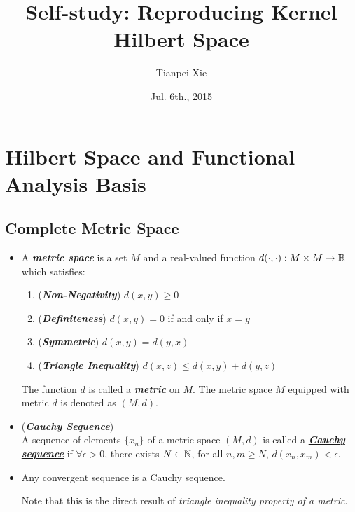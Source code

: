 \documentclass[11pt]{article}
\begin{document}
\title{Self-study: Reproducing Kernel Hilbert Space}
\author{ Tianpei Xie}
\date{ Jul. 6th., 2015 }
\maketitle
\tableofcontents
\newpage
\section{Hilbert Space and Functional Analysis Basis}
\subsection{Complete Metric Space}
\begin{itemize}
\item \begin{definition}
A \emph{\textbf{metric space}} is a set $M$ and a real-valued function $d(\cdot , \cdot): M \times M \rightarrow {\mathbb R}$  which satisfies:
\begin{enumerate}
\item (\emph{\textbf{Non-Negativity}}) $d(x, y) \ge 0$
\item (\emph{\textbf{Definiteness}}) $d(x, y) = 0$ if and only if $x = y$
\item (\emph{\textbf{Symmetric}}) $d(x, y) = d(y, x)$
\item (\emph{\textbf{Triangle Inequality}}) $d(x, z) \le d(x, y) + d(y, z)$
\end{enumerate} The function $d$ is called a \underline{\emph{\textbf{metric}}} on $M$. The metric space $M$ equipped with metric $d$ is denoted as $(M, d)$.
\end{definition}

\item \begin{definition} (\emph{\textbf{Cauchy Sequence}})\\
A sequence of elements $\{x_n\}$ of a metric space $(M, d)$ is called a \underline{\emph{\textbf{Cauchy sequence}}} if $\forall \epsilon >0$, there exists $N \in {\mathbb N}$, for all $n, m \ge N$, $d(x_n, x_m ) < \epsilon$.
\end{definition}

\item \begin{proposition}
Any convergent sequence is a Cauchy sequence.
\end{proposition} Note that this is the direct result of \emph{triangle inequality property of a metric}.


\end{itemize}
\end{document}
